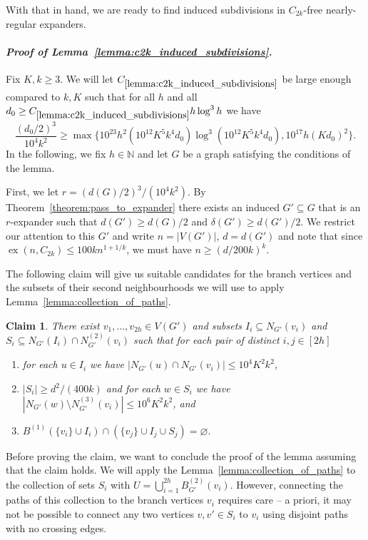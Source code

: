 \documentclass[10pt, a4paper]{article}
\numberwithin{theorem}{section} %
\newtheorem{claim}[theorem]{Claim}
\theoremstyle{remark}
\theoremstyle{definition}
\begin{document}
With that in hand, we are ready to find induced subdivisions in $C_{2k}$-free nearly-regular expanders.
\paragraph{\textit{Proof of Lemma~\ref{lemma:c2k_induced_subdivisions}.}}
    Fix $K, k \geq 3$.
    We will let $C_{\ref{lemma:c2k_induced_subdivisions}}$ be large enough compared to $k, K$ such that for all $h$ and all $d_0 \geq C_{\ref{lemma:c2k_induced_subdivisions}}h\log^3h$ we have
    \[  
        \frac{(d_0/2)^3}{10^4k^2} \geq \max\{ 10^{23}h^2(10^{12}K^5k^4d_0)\log^3(10^{12}K^5k^4d_0), 10^{17}h(Kd_0)^2\}.
    \]
    In the following, we fix $h \in \mathbb{N}$ and let $G$ be a graph satisfying the conditions of the lemma.

    First, we let $r = (d(G)/2)^3/(10^4k^2)$.
    By Theorem~\ref{theorem:pass_to_expander} there exists an induced $G' \subseteq G$ that is an $r$-expander such that $d(G') \geq d(G)/2$ and $\delta(G') \geq d(G')/2$.
    We restrict our attention to this $G'$ and write $n = |V(G')|$, $d = d(G')$ and note that since $\operatorname{ex}(n, C_{2k}) \leq 100kn^{1 + 1/k}$, we must have $n \geq (d/200k)^k$.

    The following claim will give us suitable candidates for the branch vertices and the subsets of their second neighbourhoods we will use to apply Lemma~\ref{lemma:collection_of_paths}.
    \begin{claim}\label{claim:c2k_branch_vertices}
        There exist $v_1, \dots, v_{2h} \in V(G')$ and subsets $I_i \subseteq N_{G'}(v_i)$ and $S_i \subseteq N_{G'}(I_i) \cap N^{(2)}_{G'}(v_i)$ such that for each pair of distinct $i, j\in [2h]$
    \begin{enumerate}
        \item for each $u \in I_i$ we have $|N_{G'}(u) \cap N_{G'}(v_i)| \leq 10^4K^2k^2$,
        \item $|S_i| \geq d^2/(400k)$ and for each $w \in S_i$ we have $|N_{G'}(w) \setminus N_{G'}^{(3)}(v_i)| \leq 10^6K^2 k^2$, \emph{and}
        \item $B^{(1)}(\{v_i\} \cup I_i) \cap (\{v_j\} \cup I_j \cup S_j) = \varnothing$.
    \end{enumerate}
    \end{claim}

    Before proving the claim, we want to conclude the proof of the lemma assuming that the claim holds. We will apply the Lemma~\ref{lemma:collection_of_paths} to the collection of sets $S_i$ with $U=\bigcup_{i=1}^{2h} B_{G'}^{(2)}(v_i)$. However, connecting the paths of this collection to the branch vertices $v_i$ requires care -- a priori, it may not be possible to connect any two vertices $v, v'\in S_i$ to $v_i$ using disjoint paths with no crossing edges.
\end{document}
